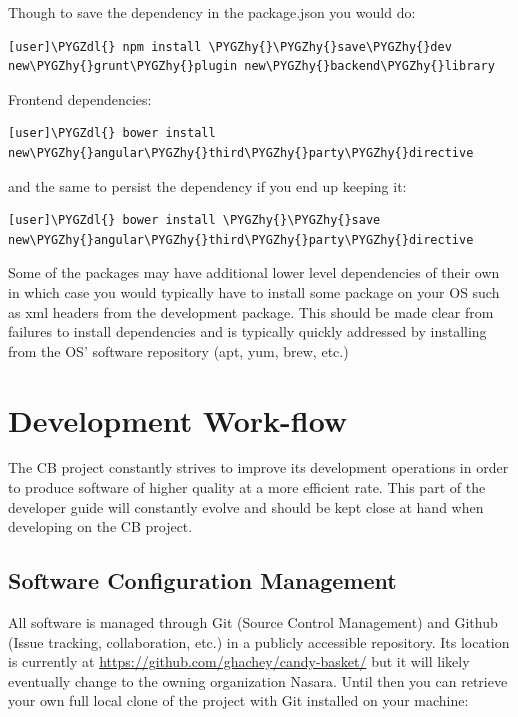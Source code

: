 \documentclass[letterpaper,10pt,english]{sphinxmanual}
\def\PYGZdl{\char`\$}
\def\PYGZhy{\char`\-}
\begin{document}
Though to save the dependency in the package.json you would do:

\begin{Verbatim}[commandchars=\\\{\}]
[user]\PYGZdl{} npm install \PYGZhy{}\PYGZhy{}save\PYGZhy{}dev new\PYGZhy{}grunt\PYGZhy{}plugin new\PYGZhy{}backend\PYGZhy{}library
\end{Verbatim}

Frontend dependencies:

\begin{Verbatim}[commandchars=\\\{\}]
[user]\PYGZdl{} bower install new\PYGZhy{}angular\PYGZhy{}third\PYGZhy{}party\PYGZhy{}directive
\end{Verbatim}

and the same to persist the dependency if you end up keeping it:

\begin{Verbatim}[commandchars=\\\{\}]
[user]\PYGZdl{} bower install \PYGZhy{}\PYGZhy{}save new\PYGZhy{}angular\PYGZhy{}third\PYGZhy{}party\PYGZhy{}directive
\end{Verbatim}

Some of the packages may have additional lower level dependencies of
their own in which case you would typically have to install some
package on your OS such as xml headers from the development
package. This should be made clear from failures to install
dependencies and is typically quickly addressed by installing from the
OS' software repository (apt, yum, brew, etc.)


\section{Development Work-flow}
\label{developer-guide:development-work-flow}
The CB project constantly strives to improve its development
operations in order to produce software of higher quality at a more
efficient rate. This part of the developer guide will constantly
evolve and should be kept close at hand when developing on the CB
project.


\subsection{Software Configuration Management}
\label{developer-guide:software-configuration-management}
All software is managed through Git (Source Control Management) and
Github (Issue tracking, collaboration, etc.) in a publicly accessible
repository. Its location is currently at
\href{https://github.com/ghachey/candy-basket/}{https://github.com/ghachey/candy-basket/} but it will likely
eventually change to the owning organization Nasara. Until then you
can retrieve your own full local clone of the project with Git
installed on your machine:
\end{document}
